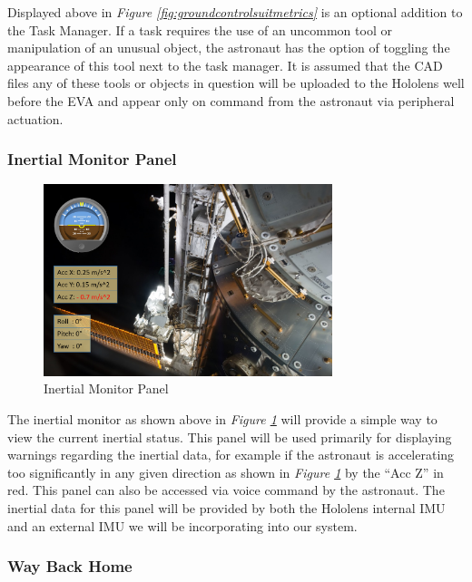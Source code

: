 \documentclass{article}
\let\Oldsubsubsection\subsubsection
\renewcommand{\subsubsection}{\FloatBarrier\Oldsubsubsection}
\begin{document}
Displayed above in \textit{Figure \ref{fig:groundcontrolsuitmetrics}} is an optional addition to the Task Manager. If a task requires the use of an uncommon tool or manipulation of an unusual object, the astronaut has the option of toggling the appearance of this tool next to the task manager. It is assumed that the CAD files any of these tools or objects in question will be uploaded to the Hololens well before the EVA and appear only on command from the astronaut via peripheral actuation.

\subsubsection{Inertial Monitor Panel}

\begin{figure}[!htb]
  \centering
  \includegraphics[width=0.75\textwidth]{assets/suitmetrics.png}
  \caption{Inertial Monitor Panel}
  \label{fig:suitmetrics}
\end{figure}

The inertial monitor as shown above in \textit{Figure \ref{fig:suitmetrics}} will provide a simple way to view the current inertial status. This panel will be used primarily for displaying warnings regarding the inertial data, for example if the astronaut is accelerating too significantly in any given direction as shown in \textit{Figure \ref{fig:suitmetrics}} by the “Acc Z” in red.  This panel can also be accessed via voice command by the astronaut. The inertial data for this panel will be provided by both the Hololens internal IMU and an external IMU we will be incorporating into our system.

\subsubsection{Way Back Home}
\end{document}
